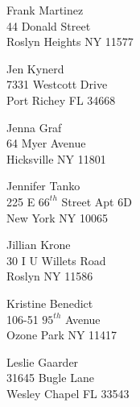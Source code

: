 \documentclass{article}
\begin{document}
\begin{center}
\begin{Huge}
\clearpage

\vspace*{\fill}
Frank Martinez\\
44 Donald Street\\
Roslyn Heights NY 11577\\
\vspace{\fill}

\clearpage

\vspace*{\fill}
Jen Kynerd\\
7331 Westcott Drive\\
Port Richey FL 34668\\
\vspace{\fill}

\clearpage

\vspace*{\fill}
Jenna Graf\\
64 Myer Avenue\\
Hicksville NY 11801\\
\vspace{\fill}

\clearpage

\vspace*{\fill}
Jennifer Tanko\\
225 E $66^{th}$ Street Apt 6D\\
New York NY 10065\\
\vspace{\fill}

\clearpage

\vspace*{\fill}
Jillian Krone\\
30 I U Willets Road\\
Roslyn NY 11586\\
\vspace{\fill}

\clearpage

\vspace*{\fill}
Kristine Benedict\\
106-51 $95^{th}$ Avenue\\
Ozone Park NY 11417\\
\vspace{\fill}

\clearpage

\vspace*{\fill}
Leslie Gaarder\\
31645 Bugle Lane\\
Wesley Chapel FL 33543\\
\vspace{\fill}


\end{Huge}
\end{center}
\end{document}
